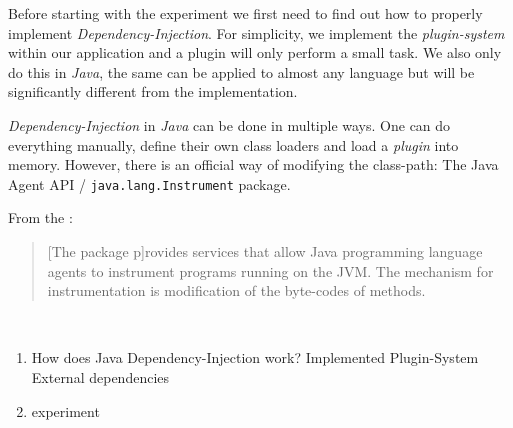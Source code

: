Before starting with the experiment we first need to find out how to properly implement \textit{Dependency-Injection}.
For simplicity, we implement the \textit{plugin-system} within our application and a plugin will only perform a small task.
We also only do this in \textit{Java}, the same can be applied to almost any language but will be significantly different from the implementation.

\textit{Dependency-Injection} in \textit{Java} can be done in multiple ways.
One can do everything manually, define their own class loaders and load a \textit{plugin} into memory.
However, there is an official way of modifying the class-path:
The Java Agent API / \texttt{java.lang.Instrument} package.

From the \textcite{Instrument-JavaDoc}:
\begin{quote}
    [The package p]rovides services that allow Java programming language agents to instrument programs running on the JVM.\newline
    The mechanism for instrumentation is modification of the byte-codes of methods.
\end{quote}~\parencite{Instrument-JavaDoc}\\



\begin{enumerate}
    \item How does Java Dependency-Injection work?
            Implemented Plugin-System
            External dependencies
    \item experiment
\end{enumerate}